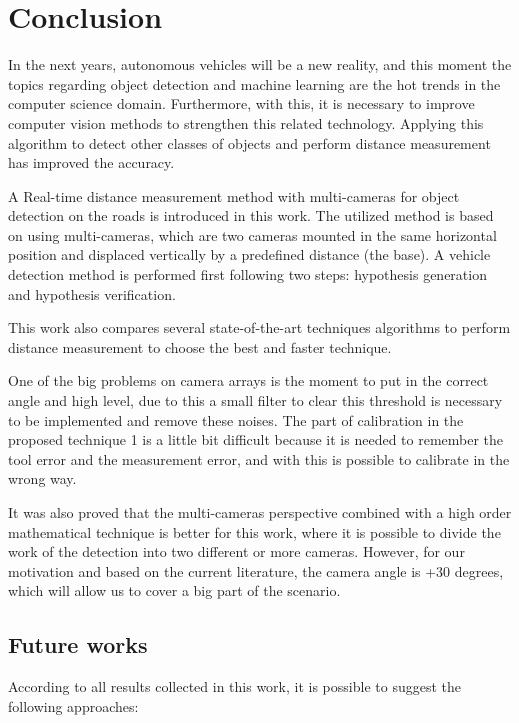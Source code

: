 \chapter{Conclusion}
\label{capitulo6}


In the next years, autonomous vehicles will be a new reality, and this moment the topics regarding object detection and machine learning are the hot trends in the computer science domain. Furthermore, with this, it is necessary to improve computer vision methods to strengthen this related technology. Applying this algorithm to detect other classes of objects and perform distance measurement has improved the accuracy. 

A Real-time distance measurement method with multi-cameras for object detection on the roads is introduced in this work. The utilized method is based on using multi-cameras, which are two cameras mounted in the same horizontal position and displaced vertically by a predefined distance (the base). A vehicle detection method is performed first following two steps: hypothesis generation and hypothesis verification. 


This work also compares several state-of-the-art techniques algorithms to perform distance measurement to choose the best and faster technique. 

One of the big problems on camera arrays is the moment to put in the correct angle and high level, due to this a small filter to clear this threshold is necessary to be implemented and remove these noises. The part of calibration in the proposed technique 1 is a little bit difficult because it is needed to remember the tool error and the measurement error, and with this is possible to calibrate in the wrong way. 

It was also proved that the multi-cameras perspective combined with a high order mathematical technique is better for this work, where it is possible to divide the work of the detection into two different or more cameras. However, for our motivation and based on the current literature, the camera angle is +30 degrees, which will allow us to cover a big part of the scenario.   

\section{Future works}

According to all results collected in this work, it is possible to suggest the following approaches:

